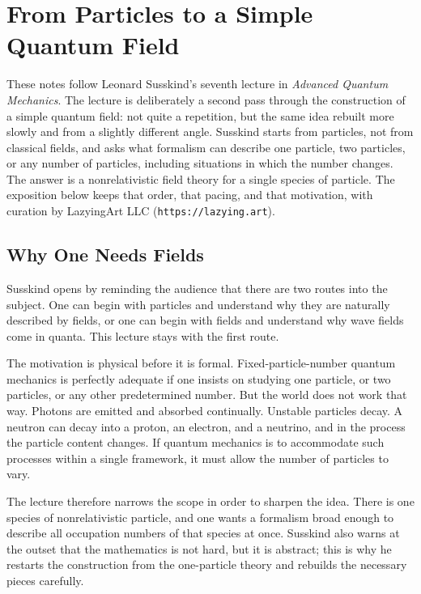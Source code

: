 \chapter{From Particles to a Simple Quantum Field}

These notes follow Leonard Susskind's seventh lecture in \emph{Advanced Quantum Mechanics}. The lecture is deliberately a second pass through the construction of a simple quantum field: not quite a repetition, but the same idea rebuilt more slowly and from a slightly different angle. Susskind starts from particles, not from classical fields, and asks what formalism can describe one particle, two particles, or any number of particles, including situations in which the number changes. The answer is a nonrelativistic field theory for a single species of particle. The exposition below keeps that order, that pacing, and that motivation, with curation by LazyingArt LLC (\texttt{https://lazying.art}).

\section{Why One Needs Fields}

Susskind opens by reminding the audience that there are two routes into the subject. One can begin with particles and understand why they are naturally described by fields, or one can begin with fields and understand why wave fields come in quanta. This lecture stays with the first route.

The motivation is physical before it is formal. Fixed-particle-number quantum mechanics is perfectly adequate if one insists on studying one particle, or two particles, or any other predetermined number. But the world does not work that way. Photons are emitted and absorbed continually. Unstable particles decay. A neutron can decay into a proton, an electron, and a neutrino, and in the process the particle content changes. If quantum mechanics is to accommodate such processes within a single framework, it must allow the number of particles to vary.

The lecture therefore narrows the scope in order to sharpen the idea. There is one species of nonrelativistic particle, and one wants a formalism broad enough to describe all occupation numbers of that species at once. Susskind also warns at the outset that the mathematics is not hard, but it is abstract; this is why he restarts the construction from the one-particle theory and rebuilds the necessary pieces carefully.


